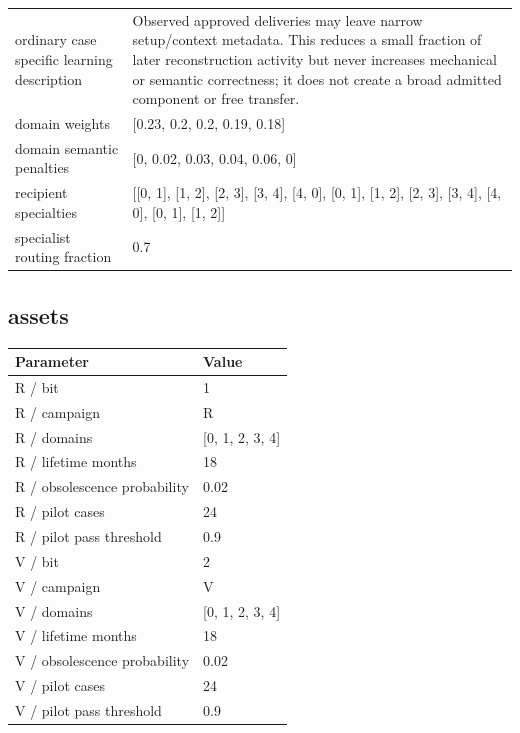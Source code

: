 \documentclass[10pt]{article}
\begin{document}
\begin{longtable}{p{.44\linewidth}p{.50\linewidth}}
ordinary case specific learning description & Observed approved deliveries may leave narrow setup/context metadata. This reduces a small fraction of later reconstruction activity but never increases mechanical or semantic correctness; it does not create a broad admitted component or free transfer.\\

domain weights & [0.23, 0.2, 0.2, 0.19, 0.18]\\

domain semantic penalties & [0, 0.02, 0.03, 0.04, 0.06, 0]\\

recipient specialties & [[0, 1], [1, 2], [2, 3], [3, 4], [4, 0], [0, 1], [1, 2], [2, 3], [3, 4], [4, 0], [0, 1], [1, 2]]\\

specialist routing fraction & 0.7\\

\bottomrule\end{longtable}

\subsection*{assets}

\begin{longtable}{p{.44\linewidth}p{.50\linewidth}}\toprule Parameter & Value \\\midrule\endhead

R / bit & 1\\

R / campaign & R\\

R / domains & [0, 1, 2, 3, 4]\\

R / lifetime months & 18\\

R / obsolescence probability & 0.02\\

R / pilot cases & 24\\

R / pilot pass threshold & 0.9\\

V / bit & 2\\

V / campaign & V\\

V / domains & [0, 1, 2, 3, 4]\\

V / lifetime months & 18\\

V / obsolescence probability & 0.02\\

V / pilot cases & 24\\

V / pilot pass threshold & 0.9\\

\bottomrule\end{longtable}
\end{document}
